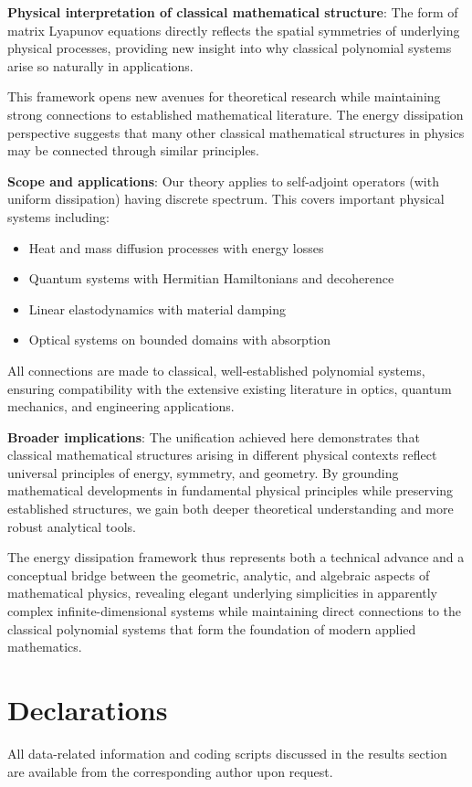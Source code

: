 \documentclass[a4paper,12pt]{article}
\begin{document}
\textbf{Physical interpretation of classical mathematical structure}: The form of matrix Lyapunov equations directly reflects the spatial symmetries of underlying physical processes, providing new insight into why classical polynomial systems arise so naturally in applications.

This framework opens new avenues for theoretical research while maintaining strong connections to established mathematical literature. The energy dissipation perspective suggests that many other classical mathematical structures in physics may be connected through similar principles.

\textbf{Scope and applications}: Our theory applies to self-adjoint operators (with uniform dissipation) having discrete spectrum. This covers important physical systems including:
\begin{itemize}
\item Heat and mass diffusion processes with energy losses
\item Quantum systems with Hermitian Hamiltonians and decoherence  
\item Linear elastodynamics with material damping
\item Optical systems on bounded domains with absorption
\end{itemize}

All connections are made to classical, well-established polynomial systems, ensuring compatibility with the extensive existing literature in optics, quantum mechanics, and engineering applications.

\textbf{Broader implications}: The unification achieved here demonstrates that classical mathematical structures arising in different physical contexts reflect universal principles of energy, symmetry, and geometry. By grounding mathematical developments in fundamental physical principles while preserving established structures, we gain both deeper theoretical understanding and more robust analytical tools.

The energy dissipation framework thus represents both a technical advance and a conceptual bridge between the geometric, analytic, and algebraic aspects of mathematical physics, revealing elegant underlying simplicities in apparently complex infinite-dimensional systems while maintaining direct connections to the classical polynomial systems that form the foundation of modern applied mathematics.

\section*{Declarations}
All data-related information and coding scripts discussed in the results section are available from the 
corresponding author upon request.
\end{document}
